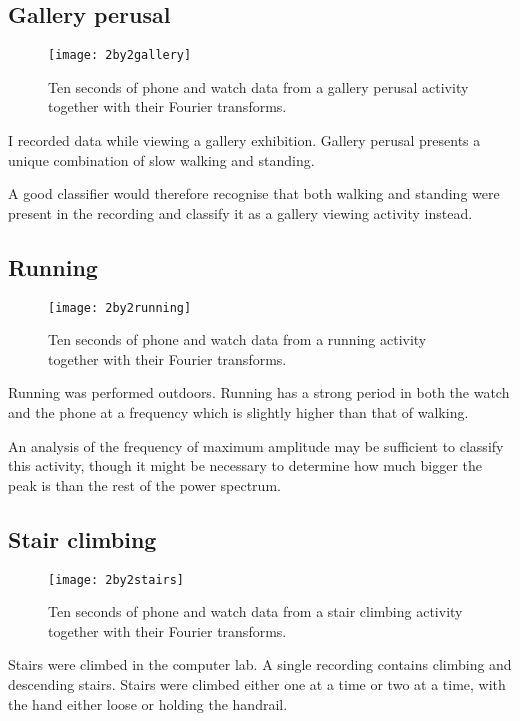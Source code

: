     \subsection{Gallery perusal}
      \begin{figure}[!th]
        \centering
        \texttt{[image: 2by2gallery]}
        \caption[Gallery perusal sample]{Ten seconds of phone and watch data from a gallery perusal activity together with their Fourier transforms.}
        \label{fig:2by2gallery}
      \end{figure}
      
      I recorded data while viewing a gallery exhibition. Gallery perusal presents a unique combination of slow walking and standing.
      
      A good classifier would therefore recognise that both walking and standing were present in the recording and classify it as a gallery viewing activity instead.
    \pagebreak[4]
    \subsection{Running}
      \begin{figure}[!th]
        \centering
        \texttt{[image: 2by2running]}
        \caption[Running sample]{Ten seconds of phone and watch data from a running activity together with their Fourier transforms.}
        \label{fig:2by2running}
      \end{figure}
      
      Running was performed outdoors. Running has a strong period in both the watch and the phone at a frequency which is slightly higher than that of walking.
      
      An analysis of the frequency of maximum amplitude may be sufficient to classify this activity, though it might be necessary to determine how much bigger the peak is than the rest of the power spectrum.
      
    \pagebreak[4]
    \subsection{Stair climbing}
      \begin{figure}[!th]
        \centering
        \texttt{[image: 2by2stairs]}
        \caption[Stair climbing sample]{Ten seconds of phone and watch data from a stair climbing activity together with their Fourier transforms.}
        \label{fig:2by2stairs}
      \end{figure}
      Stairs were climbed in the computer lab. A single recording contains climbing and descending stairs. Stairs were climbed either one at a time or two at a time, with the hand either loose or holding the handrail.
      
